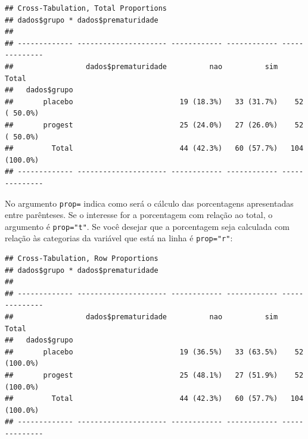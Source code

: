 \documentclass[
]{book}
\newenvironment{Shaded}{\begin{snugshade}}{\end{snugshade}}
\newcommand{\DataTypeTok}[1]{\textcolor[rgb]{0.13,0.29,0.53}{#1}}
\newcommand{\KeywordTok}[1]{\textcolor[rgb]{0.13,0.29,0.53}{\textbf{#1}}}
\newcommand{\NormalTok}[1]{#1}
\newcommand{\OperatorTok}[1]{\textcolor[rgb]{0.81,0.36,0.00}{\textbf{#1}}}
\newcommand{\StringTok}[1]{\textcolor[rgb]{0.31,0.60,0.02}{#1}}
\begin{document}
\begin{Shaded}
\end{Shaded}

\begin{verbatim}
## Cross-Tabulation, Total Proportions  
## dados$grupo * dados$prematuridade  
## 
## ------------- --------------------- ------------ ------------ --------------
##                 dados$prematuridade          nao          sim          Total
##   dados$grupo                                                               
##       placebo                         19 (18.3%)   33 (31.7%)    52 ( 50.0%)
##       progest                         25 (24.0%)   27 (26.0%)    52 ( 50.0%)
##         Total                         44 (42.3%)   60 (57.7%)   104 (100.0%)
## ------------- --------------------- ------------ ------------ --------------
\end{verbatim}

No argumento \texttt{prop=} indica como será o cálculo das porcentagens apresentadas entre parênteses. Se o interesse for a porcentagem com relação ao total, o argumento é \texttt{prop="t"}. Se você desejar que a porcentagem seja calculada com relação às categorias da variável que está na linha é \texttt{prop="r"}:

\begin{Shaded}
\end{Shaded}

\begin{verbatim}
## Cross-Tabulation, Row Proportions  
## dados$grupo * dados$prematuridade  
## 
## ------------- --------------------- ------------ ------------ --------------
##                 dados$prematuridade          nao          sim          Total
##   dados$grupo                                                               
##       placebo                         19 (36.5%)   33 (63.5%)    52 (100.0%)
##       progest                         25 (48.1%)   27 (51.9%)    52 (100.0%)
##         Total                         44 (42.3%)   60 (57.7%)   104 (100.0%)
## ------------- --------------------- ------------ ------------ --------------
\end{verbatim}
\end{document}
